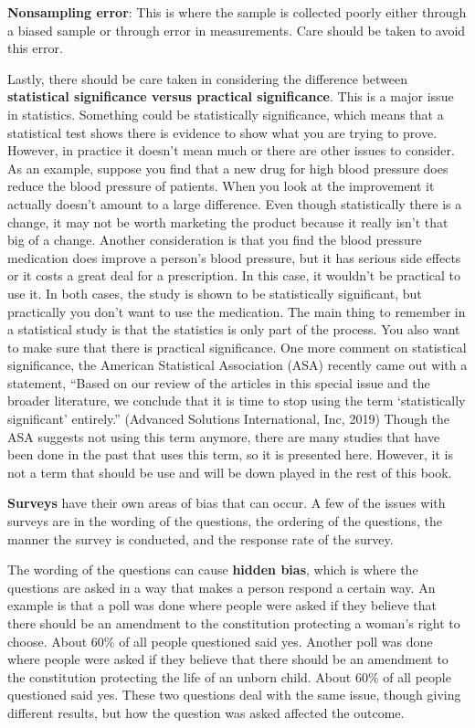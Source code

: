 \documentclass[
]{book}
\begin{document}
\textbf{Nonsampling error}: This is where the sample is collected poorly either through a biased sample or through error in measurements. Care should be taken to avoid this error.

Lastly, there should be care taken in considering the difference between \textbf{statistical significance versus practical significance}. This is a major issue in statistics. Something could be statistically significance, which means that a statistical test shows there is evidence to show what you are trying to prove. However, in practice it doesn't mean much or there are other issues to consider. As an example, suppose you find that a new drug for high blood pressure does reduce the blood pressure of patients. When you look at the improvement it actually doesn't amount to a large difference. Even though statistically there is a change, it may not be worth marketing the product because it really isn't that big of a change. Another consideration is that you find the blood pressure medication does improve a person's blood pressure, but it has serious side effects or it costs a great deal for a prescription. In this case, it wouldn't be practical to use it. In both cases, the study is shown to be statistically significant, but practically you don't want to use the medication. The main thing to remember in a statistical study is that the statistics is only part of the process. You also want to make sure that there is practical significance. One more comment on statistical significance, the American Statistical Association (ASA) recently came out with a statement, ``Based on our review of the articles in this special issue and the broader literature, we conclude that it is time to stop using the term `statistically significant' entirely.'' (Advanced Solutions International, Inc, 2019) Though the ASA suggests not using this term anymore, there are many studies that have been done in the past that uses this term, so it is presented here. However, it is not a term that should be use and will be down played in the rest of this book.

\textbf{Surveys} have their own areas of bias that can occur. A few of the issues with surveys are in the wording of the questions, the ordering of the questions, the manner the survey is conducted, and the response rate of the survey.

The wording of the questions can cause \textbf{hidden bias}, which is where the questions are asked in a way that makes a person respond a certain way. An example is that a poll was done where people were asked if they believe that there should be an amendment to the constitution protecting a woman's right to choose. About 60\% of all people questioned said yes. Another poll was done where people were asked if they believe that there should be an amendment to the constitution protecting the life of an unborn child. About 60\% of all people questioned said yes. These two questions deal with the same issue, though giving different results, but how the question was asked affected the outcome.
\end{document}
